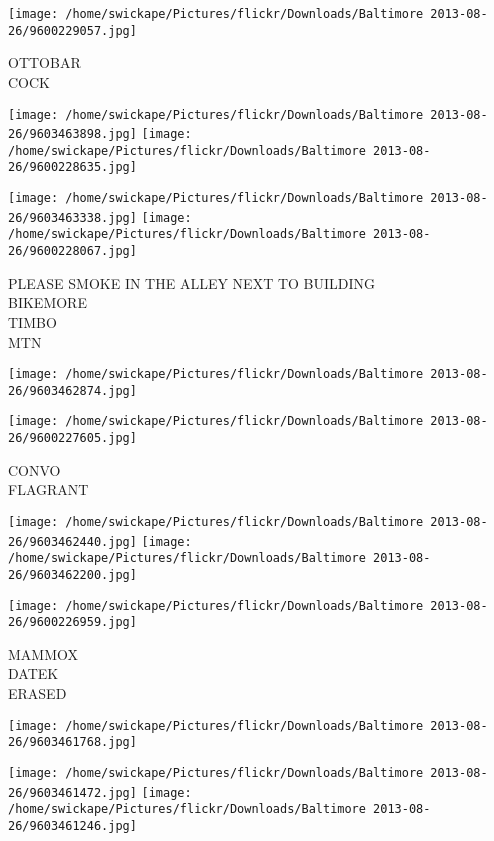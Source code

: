 \documentclass[10pt,letterpaper]{article}
\begin{document}
\vspace{0.25in}
\texttt{[image: /home/swickape/Pictures/flickr/Downloads/Baltimore 2013-08-26/9600229057.jpg]}

OTTOBAR\\
COCK\\
\pagebreak

\texttt{[image: /home/swickape/Pictures/flickr/Downloads/Baltimore 2013-08-26/9603463898.jpg]}
\texttt{[image: /home/swickape/Pictures/flickr/Downloads/Baltimore 2013-08-26/9600228635.jpg]}

\texttt{[image: /home/swickape/Pictures/flickr/Downloads/Baltimore 2013-08-26/9603463338.jpg]}
\texttt{[image: /home/swickape/Pictures/flickr/Downloads/Baltimore 2013-08-26/9600228067.jpg]}

PLEASE SMOKE IN THE ALLEY NEXT TO BUILDING\\
BIKEMORE\\
TIMBO\\
MTN\\
\pagebreak

\texttt{[image: /home/swickape/Pictures/flickr/Downloads/Baltimore 2013-08-26/9603462874.jpg]}

\vspace{0.25in}
\texttt{[image: /home/swickape/Pictures/flickr/Downloads/Baltimore 2013-08-26/9600227605.jpg]}

CONVO\\
FLAGRANT\\
\pagebreak

\texttt{[image: /home/swickape/Pictures/flickr/Downloads/Baltimore 2013-08-26/9603462440.jpg]}
\texttt{[image: /home/swickape/Pictures/flickr/Downloads/Baltimore 2013-08-26/9603462200.jpg]}

\texttt{[image: /home/swickape/Pictures/flickr/Downloads/Baltimore 2013-08-26/9600226959.jpg]}

MAMMOX\\
DATEK\\
ERASED\\
\pagebreak

\texttt{[image: /home/swickape/Pictures/flickr/Downloads/Baltimore 2013-08-26/9603461768.jpg]}

\vspace{0.25in}
\texttt{[image: /home/swickape/Pictures/flickr/Downloads/Baltimore 2013-08-26/9603461472.jpg]}
\texttt{[image: /home/swickape/Pictures/flickr/Downloads/Baltimore 2013-08-26/9603461246.jpg]}
\end{document}
